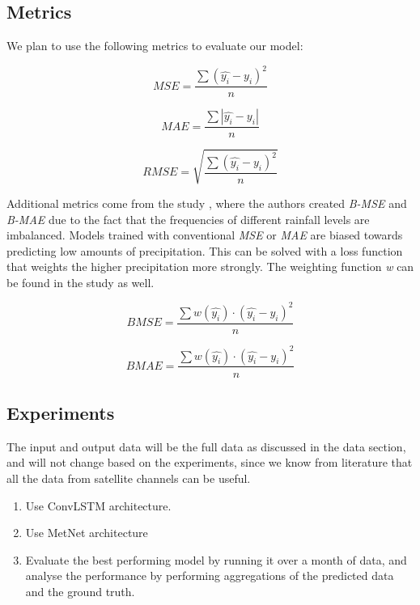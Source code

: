 \documentclass[acmtog, authorversion]{acmart}
\begin{document}



\subsection{Metrics}
We plan to use the following metrics to evaluate our model:

\begin{equation}
MSE = \frac{\sum (\hat{y_i} -y_i)^2}{n}
\end{equation}

\begin{equation}
MAE = \frac{\sum |\hat{y_i} -y_i|}{n}
\end{equation}

\begin{equation}
RMSE = \sqrt{\frac{\sum (\hat{y_i} -y_i)^2}{n}}
\end{equation}

Additional metrics come from the study \cite{shi2017deep}, where the authors created \textit{B-MSE} and \textit{B-MAE} due to the fact that the frequencies of different rainfall levels are imbalanced. Models trained with conventional \textit{MSE} or \textit{MAE} are biased towards predicting low amounts of precipitation. This can be solved with a loss function that weights the higher precipitation more strongly. The weighting function \textit{w} can be found in the study as well.

\begin{equation}
BMSE = \frac{\sum w(\hat{y_i}) \cdot (\hat{y_i} -y_i)^2}{n}
\end{equation}

\begin{equation}
BMAE = \frac{\sum w(\hat{y_i})  \cdot (\hat{y_i} -y_i)^2}{n}
\end{equation}

\subsection{Experiments}

The input and output data will be the full data as discussed in the data section, and will not change based on the experiments, since we know from literature that all the data from satellite channels can be useful.

\begin{enumerate}
    \item Use ConvLSTM architecture.
    \item Use MetNet architecture
    \item Evaluate the best performing model by running it over a month of data, and analyse the performance by performing aggregations of the predicted data and the ground truth.
\end{enumerate}
\end{document}
